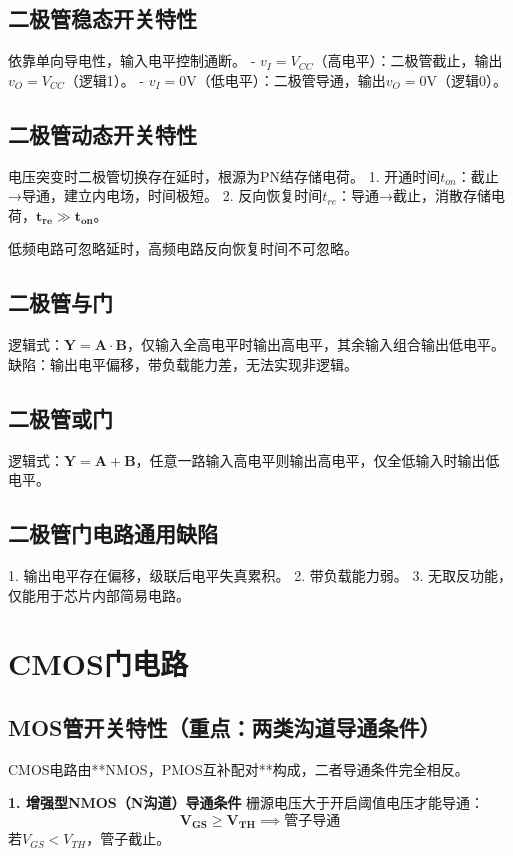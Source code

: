 \subsection{二极管稳态开关特性}
依靠单向导电性，输入电平控制通断。
- \(v_I=V_{CC}\)（高电平）：二极管截止，输出\(v_O=V_{CC}\)（逻辑1）。
- \(v_I=0\mathrm{V}\)（低电平）：二极管导通，输出\(v_O=0\mathrm{V}\)（逻辑0）。

\subsection{二极管动态开关特性}
电压突变时二极管切换存在延时，根源为PN结存储电荷。
1. 开通时间\(t_{on}\)：截止→导通，建立内电场，时间极短。
2. 反向恢复时间\(t_{re}\)：导通→截止，消散存储电荷，\(\boldsymbol{t_{re} \gg t_{on}}\)。

低频电路可忽略延时，高频电路反向恢复时间不可忽略。

\subsection{二极管与门}
逻辑式：\(\boldsymbol{Y=A\cdot B}\)，仅输入全高电平时输出高电平，其余输入组合输出低电平。
缺陷：输出电平偏移，带负载能力差，无法实现非逻辑。

\subsection{二极管或门}
逻辑式：\(\boldsymbol{Y=A+B}\)，任意一路输入高电平则输出高电平，仅全低输入时输出低电平。

\subsection{二极管门电路通用缺陷}
1. 输出电平存在偏移，级联后电平失真累积。
2. 带负载能力弱。
3. 无取反功能，仅能用于芯片内部简易电路。

\section{CMOS门电路}
\subsection{MOS管开关特性（重点：两类沟道导通条件）}
CMOS电路由**NMOS，PMOS互补配对**构成，二者导通条件完全相反。

\textbf{1. 增强型NMOS（N沟道）导通条件}
栅源电压大于开启阈值电压才能导通：
\[
\boldsymbol{V_{GS} \ge V_{TH} \implies \text{管子导通}}
\]
若\(V_{GS}<V_{TH}\)，管子截止。

